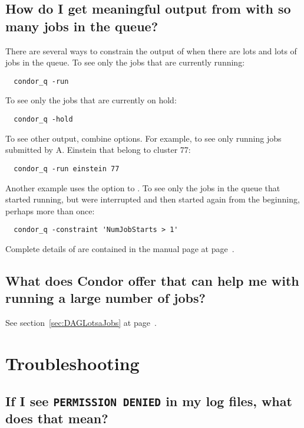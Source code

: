 \subsection*{How do I get meaningful output from  with so many jobs in the queue?}
 
There are several ways to constrain the output of  when there are
lots and lots of jobs in the queue.
To see only the jobs that are currently running:
\begin{verbatim}
  condor_q -run
\end{verbatim}
To see only the jobs that are currently on hold:
\begin{verbatim}
  condor_q -hold
\end{verbatim}
To see other output,  combine options.
For example, to see only running jobs submitted by A. Einstein
that belong to cluster 77:
\begin{verbatim}
  condor_q -run einstein 77
\end{verbatim}
Another example uses the  option to .
To see only the jobs in the queue that started running,
but were interrupted and then started again from the beginning,
perhaps more than once: 
\footnotesize
\begin{verbatim}
  condor_q -constraint 'NumJobStarts > 1'
\end{verbatim}
\normalsize
Complete details of  are contained in the manual page
at page~\pageref{man-condor-q}.

\subsection*{What does Condor offer that can help me with running
a large number of jobs?}

See section~\ref{sec:DAGLotsaJobs} at page~\pageref{sec:DAGLotsaJobs}.
 

\section{Troubleshooting}

\subsection*{If I see \texttt{PERMISSION DENIED} in my log files,
what does that mean?}

